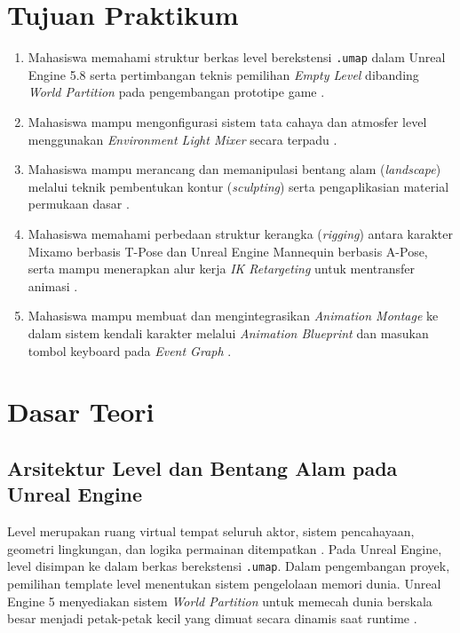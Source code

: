 \documentclass[a4paper,oneside,12pt]{report}
\begin{document}
\thispagestyle{empty}
\clearpage
{}
\thispagestyle{empty}

\tableofcontents
\clearpage

\setcounter{page}{3}

\chapter[Tujuan Praktikum]{Tujuan Praktikum}
\begin{enumerate}\setlength{\itemsep}{0.3em}\setlength{\parskip}{0pt}
	\item Mahasiswa memahami struktur berkas level berekstensi \texttt{.umap} dalam Unreal Engine 5.8 serta pertimbangan teknis pemilihan \textit{Empty Level} dibanding \textit{World Partition} pada pengembangan prototipe game \cite{modul6,epic-levels}.
	\item Mahasiswa mampu mengonfigurasi sistem tata cahaya dan atmosfer level menggunakan \textit{Environment Light Mixer} secara terpadu \cite{modul6,epic-lightmixer}.
	\item Mahasiswa mampu merancang dan memanipulasi bentang alam (\textit{landscape}) melalui teknik pembentukan kontur (\textit{sculpting}) serta pengaplikasian material permukaan dasar \cite{modul6,epic-landscape,epic-sculpt}.
	\item Mahasiswa memahami perbedaan struktur kerangka (\textit{rigging}) antara karakter Mixamo berbasis T-Pose dan Unreal Engine Mannequin berbasis A-Pose, serta mampu menerapkan alur kerja \textit{IK Retargeting} untuk mentransfer animasi \cite{modul6,epic-skeletal,epic-retargeter,mixamo-web}.
	\item Mahasiswa mampu membuat dan mengintegrasikan \textit{Animation Montage} ke dalam sistem kendali karakter melalui \textit{Animation Blueprint} dan masukan tombol keyboard pada \textit{Event Graph} \cite{modul6,epic-montage,epic-naming}.
\end{enumerate}
\clearpage

\chapter{Dasar Teori}

\section{Arsitektur Level dan Bentang Alam pada Unreal Engine}
Level merupakan ruang virtual tempat seluruh aktor, sistem pencahayaan, geometri lingkungan, dan logika permainan ditempatkan \cite{epic-levels}. Pada Unreal Engine, level disimpan ke dalam berkas berekstensi \texttt{.umap}. Dalam pengembangan proyek, pemilihan template level menentukan sistem pengelolaan memori dunia. Unreal Engine 5 menyediakan sistem \textit{World Partition} untuk memecah dunia berskala besar menjadi petak-petak kecil yang dimuat secara dinamis saat runtime \cite{epic-levels}.
\end{document}
